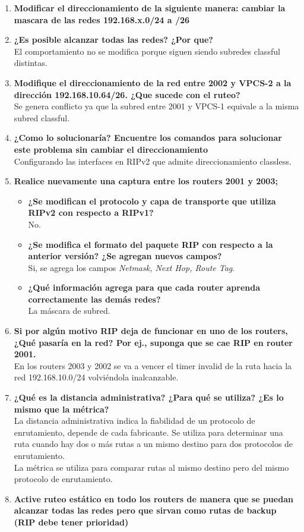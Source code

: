 \documentclass[letterpaper,12pt]{article}
\begin{document}
\begin{enumerate}
		\item \textbf{Modificar el direccionamiento de la siguiente manera: cambiar la mascara de las redes 192.168.x.0/24 a /26}
		\item \textbf{¿Es posible alcanzar todas las redes? ¿Por que?} \\
		El comportamiento no se modifica porque siguen siendo subredes classful distintas.
		\item \textbf{Modifique  el  direccionamiento  de  la  red  entre  2002  y  VPCS-2  a  la dirección 192.168.10.64/26. ¿Que sucede con el ruteo?} \\
		Se genera conflicto ya que la subred entre 2001 y VPCS-1 equivale a la misma subred classful.
		\item \textbf{¿Como lo solucionaría? Encuentre los comandos para solucionar este problema sin cambiar el direccionamiento} \\
		Configurando las interfaces en RIPv2 que admite direccionamiento classless.
		\item \textbf{Realice nuevamente una captura entre los routers 2001 y 2003;}
		\begin{itemize}
			\item \textbf{¿Se modifican el protocolo y capa de transporte que utiliza RIPv2 con respecto a RIPv1?} \\
			No.
			\item \textbf{¿Se modifica el formato del paquete RIP con respecto a la anterior versión? ¿Se agregan nuevos campos?} \\
			Si, se agrega los campos \textit{Netmask, Next Hop, Route Tag}.
			\item \textbf{¿Qué información agrega para que cada router aprenda correctamente las demás redes?} \\
			La máscara de subred.
		\end{itemize}
		\item \textbf{Si por algún motivo RIP deja de funcionar en uno de los routers, ¿Qué pasaría en la red? Por ej., suponga que se cae RIP en router 2001.} \\
		En los routers 2003 y 2002 se va a vencer el timer invalid de la ruta hacia la red 192.168.10.0/24 volviéndola inalcanzable. 
		\item \textbf{¿Qué es la distancia administrativa? ¿Para qué se utiliza? ¿Es lo mismo que la métrica?} \\
		La distancia administrativa indica la fiabilidad de un protocolo de enrutamiento, depende de cada fabricante. Se utiliza para determinar una ruta cuando hay dos o más rutas a un mismo destino para dos protocolos de enrutamiento. \\
		La métrica se utiliza para comparar rutas al mismo destino pero del mismo protocolo de enrutamiento.
		\item \textbf{Active ruteo estático en todo los routers de manera que  se puedan alcanzar todas las redes pero que sirvan como rutas de backup (RIP debe tener prioridad)}
		\begin{figure}[ht] 
        

\end{figure}
\end{enumerate}
\end{document}

